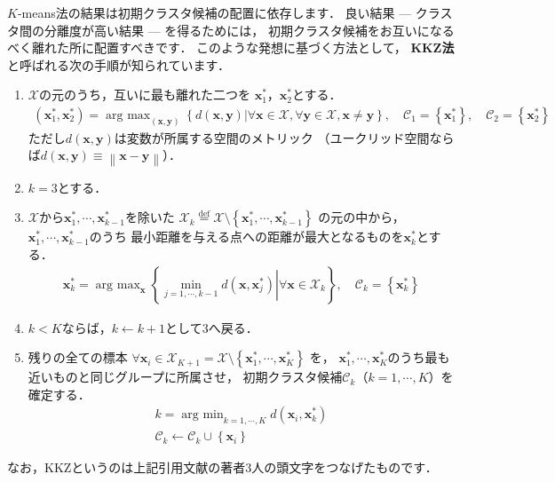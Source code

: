 ﻿\documentclass{jsarticle}
\begin{document}
$K$-means法の結果は初期クラスタ候補の配置に依存します．
良い結果 --- クラスタ間の分離度が高い結果 --- を得るためには，
初期クラスタ候補をお互いになるべく離れた所に配置すべきです．
このような発想に基づく方法として，
{\bf KKZ法}\cite{bib:katsavounidis1994}と呼ばれる次の手順が知られています．
\begin{screen}
\begin{enumerate}
\setlength{\itemsep}{-.2\baselineskip}
\item{$\mathcal{X}$の元のうち，互いに最も離れた二つを
$\bm{x}^{*}_{1}$，$\bm{x}^{*}_{2}$とする．
\begin{align*}
(\bm{x}^{*}_{1},\bm{x}^{*}_{2})=\mathop{\mathrm{arg~max}}_{(\bm{x},\bm{y})}\left\{d(\bm{x},\bm{y})
\left|
\forall\bm{x}\in\mathcal{X},
\forall\bm{y}\in\mathcal{X},
\bm{x}\neq\bm{y}
\right.
\right\},\quad
\mathcal{C}_{1}=\left\{\bm{x}^{*}_{1}\right\},\quad
\mathcal{C}_{2}=\left\{\bm{x}^{*}_{2}\right\}
\end{align*}
ただし$d(\bm{x},\bm{y})$は変数が所属する空間のメトリック
（ユークリッド空間ならば$d(\bm{x},\bm{y})\equiv\left\|\bm{x}-\bm{y}\right\|$）．
}
\item{$k=3$とする．}
\item{$\mathcal{X}$から$\bm{x}^{*}_{1},\cdots,\bm{x}^{*}_{k-1}$を除いた
$\mathcal{X}_{k}\overset{\mathrm{def}}{=}\mathcal{X}\setminus\left\{\bm{x}^{*}_{1},\cdots,\bm{x}^{*}_{k-1}\right\}$
の元の中から，
$\bm{x}^{*}_{1},\cdots,\bm{x}^{*}_{k-1}$のうち
最小距離を与える点への距離が最大となるものを$\bm{x}^{*}_{k}$とする．
\begin{align*}
\bm{x}^{*}_{k}=\mathop{\mathrm{arg~max}}_{\bm{x}}\left\{
\left.
\min_{j=1,\cdots,k-1}d(\bm{x},\bm{x}^{*}_{j})
\right|
\forall\bm{x}\in\mathcal{X}_{k}
\right\},\quad
\mathcal{C}_{k}=\left\{\bm{x}^{*}_{k}\right\}
\end{align*}
}
\item{$k<K$ならば，$k\leftarrow k+1$として3へ戻る．}
\item{
残りの全ての標本
$\forall\bm{x}_{i}\in\mathcal{X}_{K+1}=\mathcal{X}\setminus\left\{\bm{x}^{*}_{1},\cdots,\bm{x}^{*}_{K}\right\}$
を，
$\bm{x}^{*}_{1},\cdots,\bm{x}^{*}_{K}$のうち最も近いものと同じグループに所属させ，
初期クラスタ候補$\mathcal{C}_{k}$（$k=1,\cdots,K$）を確定する．
\begin{align*}
k=\mathop{\mathrm{arg~min}}_{k=1,\cdots,K}d(\bm{x}_{i},\bm{x}^{*}_{k})
\\
\mathcal{C}_{k}\leftarrow\mathcal{C}_{k}\cup\left\{\bm{x}_{i}\right\}
\end{align*}
}
\end{enumerate}
\end{screen}
なお，KKZというのは上記引用文献の著者3人の頭文字をつなげたものです．
\end{document}
